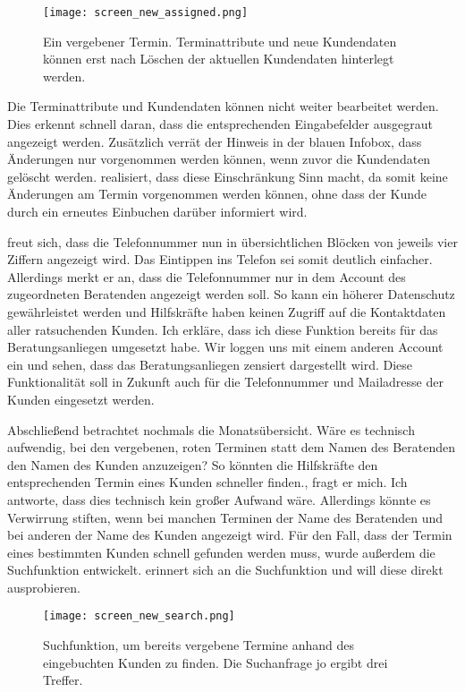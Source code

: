 \begin{figure}[H]
    \caption{Ein vergebener Termin. Terminattribute und neue Kundendaten können erst nach Löschen der aktuellen Kundendaten hinterlegt werden.}
    \centering
    \texttt{[image: screen\_new\_assigned.png]}
\end{figure}

Die Terminattribute und Kundendaten können nicht weiter bearbeitet werden. Dies
erkennt \ipName schnell daran, dass die entsprechenden Eingabefelder ausgegraut
angezeigt werden. Zusätzlich verrät der Hinweis in der blauen Infobox, dass
Änderungen nur vorgenommen werden können, wenn zuvor die Kundendaten gelöscht
werden. \ipName realisiert, dass diese Einschränkung Sinn macht, da somit keine
Änderungen am Termin vorgenommen werden können, ohne dass der Kunde durch ein
erneutes Einbuchen darüber informiert wird.

\ipName freut sich, dass die Telefonnummer nun in übersichtlichen Blöcken von jeweils vier Ziffern angezeigt wird. Das Eintippen ins Telefon sei somit deutlich einfacher. Allerdings merkt er an, dass die Telefonnummer nur in dem Account des zugeordneten Beratenden angezeigt werden soll. So kann ein höherer Datenschutz gewährleistet werden und Hilfskräfte haben keinen Zugriff auf die Kontaktdaten aller ratsuchenden Kunden. Ich erkläre, dass ich diese Funktion bereits für das Beratungsanliegen umgesetzt habe. Wir loggen uns mit einem anderen Account ein und sehen, dass das Beratungsanliegen zensiert dargestellt wird. Diese Funktionalität soll in Zukunft auch für die Telefonnummer und Mailadresse der Kunden eingesetzt werden.

Abschließend betrachtet \ipName nochmals die Monatsübersicht. \glqq{}Wäre es
technisch aufwendig, bei den vergebenen, roten Terminen statt dem Namen des
Beratenden den Namen des Kunden anzuzeigen? So könnten die Hilfskräfte den
entsprechenden Termin eines Kunden schneller finden.\grqq{}, fragt er
mich\cite{clavesUsertest}. Ich antworte, dass dies technisch kein großer
Aufwand wäre. Allerdings könnte es Verwirrung stiften, wenn bei manchen
Terminen der Name des Beratenden und bei anderen der Name des Kunden angezeigt
wird. Für den Fall, dass der Termin eines bestimmten Kunden schnell gefunden
werden muss, wurde außerdem die Suchfunktion entwickelt. \ipName erinnert sich
an die Suchfunktion und will diese direkt ausprobieren.

\begin{figure}[H]
    \caption{Suchfunktion, um bereits vergebene Termine anhand des eingebuchten Kunden zu finden. Die Suchanfrage \glqq{}jo\grqq{} ergibt drei Treffer.}
    \centering
    \texttt{[image: screen\_new\_search.png]}
\end{figure}

